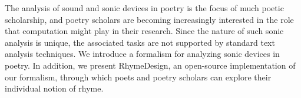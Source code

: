 The analysis of sound and sonic devices in poetry is the focus of much poetic scholarship, and poetry scholars are becoming increasingly interested in the role that computation might play in their research. Since the nature of such sonic analysis is unique, the associated tasks are not supported by standard text analysis techniques. We introduce a formalism for analyzing sonic devices in poetry. In addition, we present RhymeDesign, an open-source implementation of our formalism, through which poets and poetry scholars can explore their individual notion of rhyme.
